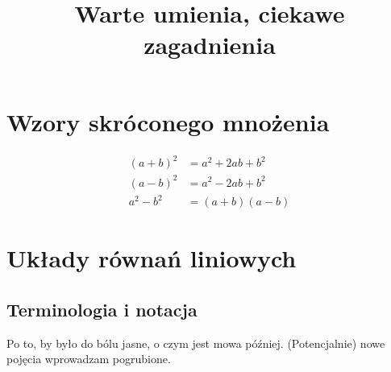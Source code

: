 \documentclass{article}
\title{Warte umienia, ciekawe zagadnienia}
\author{}
\date{}
\theoremstyle{remark}
\begin{document}
\maketitle
\section{Wzory skróconego mnożenia}
\begin{align}
  (a+b)^2&=a^2+2ab+b^2\\
  (a-b)^2&=a^2-2ab+b^2\\
  a^2-b^2&=(a+b)(a-b)
\end{align}
\section{Układy równań liniowych}
\subsection{Terminologia i notacja}
Po to, by było do bólu jasne, o czym jest mowa później.
(Potencjalnie) nowe pojęcia wprowadzam pogrubione.
\end{document}
